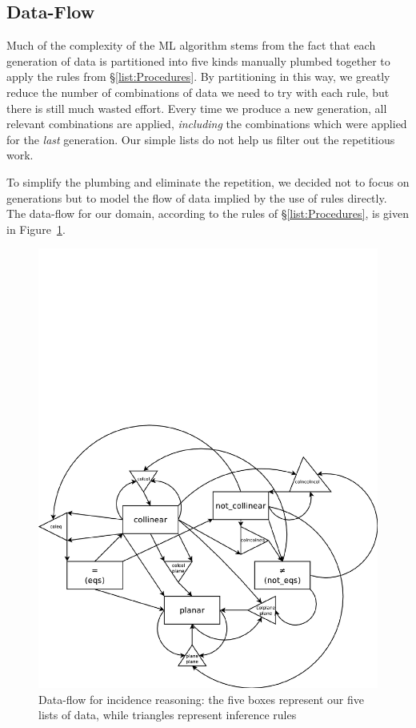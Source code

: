 \subsection{Data-Flow}
Much of the complexity of the ML algorithm stems from the fact that each generation of data is partitioned into five kinds manually plumbed together to apply the rules from \S\ref{list:Procedures}. By partitioning in this way, we greatly reduce the number of combinations of data we need to try with each rule, but there is still much wasted effort. Every time we produce a new generation, all relevant combinations are applied, \emph{including} the combinations which were applied for the \emph{last} generation. Our simple lists do not help us filter out the repetitious work.

To simplify the plumbing and eliminate the repetition, we decided not to focus on generations but to model the flow of data implied by the use of rules directly. The data-flow for our domain, according to the rules of \S\ref{list:Procedures}, is given in Figure~\ref{fig:DataFlow}.

\begin{figure}
\centering\includegraphics[scale=0.5]{automation/DataFlow}
\caption{Data-flow for incidence reasoning: the five boxes represent our five lists of data, while triangles represent inference rules}
\label{fig:DataFlow}
\end{figure}


